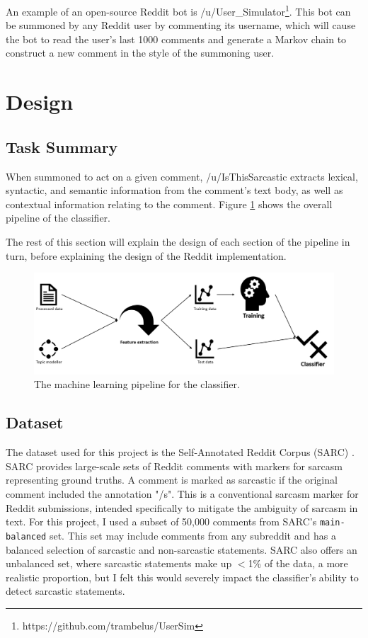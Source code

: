 \documentclass[a4paper,12pt]{article}
\begin{document}
An example of an open-source Reddit bot is /u/User\_Simulator\footnote{https://github.com/trambelus/UserSim}. This bot can be summoned by any Reddit user by commenting its username, which will cause the bot to read the user's last 1000 comments and generate a Markov chain to construct a new comment in the style of the summoning user.

\section{Design}
\subsection{Task Summary}
When summoned to act on a given comment, /u/IsThisSarcastic extracts lexical, syntactic, and semantic information from the comment's text body, as well as contextual information relating to the comment. Figure \ref{fig:cmd1} shows the overall pipeline of the classifier.

The rest of this section will explain the design of each section of the pipeline in turn, before explaining the design of the Reddit implementation.

\begin{figure}[h!]
\includegraphics[width=\linewidth]{Figures/pipeline.png}
\caption{The machine learning pipeline for the classifier.}
\label{fig:cmd1}
\end{figure}

\subsection{Dataset}
The dataset used for this project is the Self-Annotated Reddit Corpus (SARC) \cite{khodakLargeSelfAnnotatedCorpus2018}. SARC provides large-scale sets of Reddit comments with markers for sarcasm representing ground truths. A comment is marked as sarcastic if the original comment included the annotation "/s". This is a conventional sarcasm marker for Reddit submissions, intended specifically to mitigate the ambiguity of sarcasm in text. For this project, I used a subset of 50,000 comments from SARC's \texttt{main-balanced} set. This set may include comments from any subreddit and has a balanced selection of sarcastic and non-sarcastic statements. SARC also offers an unbalanced set, where sarcastic statements make up $<$1\% of the data, a more realistic proportion, but I felt this would severely impact the classifier's ability to detect sarcastic statements.
\end{document}
